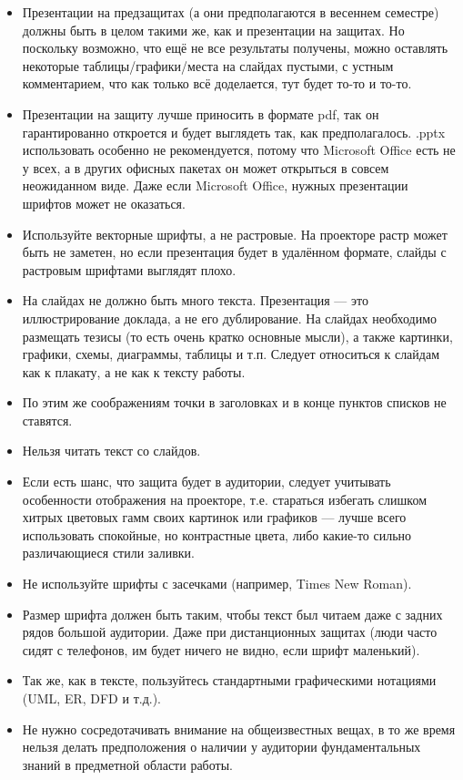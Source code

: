 \documentclass{article}
\begin{document}
\begin{itemize}
    \item Презентации на предзащитах (а они предполагаются в весеннем семестре) должны быть в целом такими же, как и презентации на защитах. Но поскольку возможно, что ещё не все результаты получены, можно оставлять некоторые таблицы/графики/места на слайдах пустыми, с устным комментарием, что как только всё доделается, тут будет то-то и то-то.
    \item Презентации на защиту лучше приносить в формате pdf, так он гарантированно откроется и будет выглядеть так, как предполагалось. .pptx использовать особенно не рекомендуется, потому что Microsoft Office есть не у всех, а в других офисных пакетах он может открыться в совсем неожиданном виде. Даже если Microsoft Office, нужных презентации шрифтов может не оказаться.
    \item Используйте векторные шрифты, а не растровые. На проекторе растр может быть не заметен, но если презентация будет в удалённом формате, слайды с растровым шрифтами выглядят плохо.
    \item На слайдах не должно быть много текста. Презентация --- это иллюстрирование доклада, а не его дублирование. На слайдах необходимо размещать тезисы (то есть очень кратко основные мысли), а также картинки, графики, схемы, диаграммы, таблицы и т.п. Следует относиться к слайдам как к плакату, а не как к тексту работы.
    \item По этим же соображениям точки в заголовках и в конце пунктов списков не ставятся.
    \item Нельзя читать текст со слайдов.
    \item Если есть шанс, что защита будет в аудитории, следует учитывать особенности отображения на проекторе, т.е. стараться избегать слишком хитрых цветовых гамм своих картинок или графиков --- лучше всего использовать спокойные, но контрастные цвета, либо какие-то сильно различающиеся стили заливки.
    \item Не используйте шрифты с засечками (например, Times New Roman).
    \item Размер шрифта должен быть таким, чтобы текст был читаем даже с задних рядов большой аудитории. Даже при дистанционных защитах (люди часто сидят с телефонов, им будет ничего не видно, если шрифт маленький).
    \item Так же, как в тексте, пользуйтесь стандартными графическими нотациями (UML, ER, DFD и т.д.).
    \item Не нужно сосредотачивать внимание на общеизвестных вещах, в то же время нельзя делать предположения о наличии у аудитории фундаментальных знаний в предметной области работы.

\end{itemize}
\end{document}
